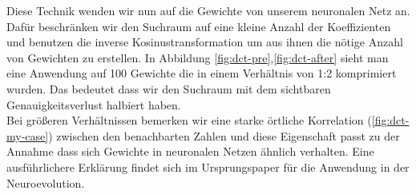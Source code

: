             Diese Technik wenden wir nun auf die Gewichte von unserem neuronalen Netz an. Dafür beschränken wir den Suchraum auf eine kleine Anzahl der Koeffizienten und benutzen die inverse Kosinustransformation um aus ihnen die nötige Anzahl von Gewichten zu erstellen. In Abbildung \ref{fig:dct-pre},\ref{fig:dct-after} sieht man eine Anwendung auf 100 Gewichte die in einem Verhältnis von 1:2 komprimiert wurden. Das bedeutet dass wir den Suchraum mit dem sichtbaren Genauigkeitsverlust halbiert haben.\\

            \noindent
            Bei größeren Verhältnissen bemerken wir eine starke örtliche Korrelation (\ref{fig:dct-my-case}) zwischen den benachbarten Zahlen und diese Eigenschaft passt zu der Annahme dass sich Gewichte in neuronalen Netzen ähnlich verhalten. Eine ausführlichere Erklärung findet sich im Ursprungspaper für die Anwendung in der Neuroevolution.\cite{cosyne1}
